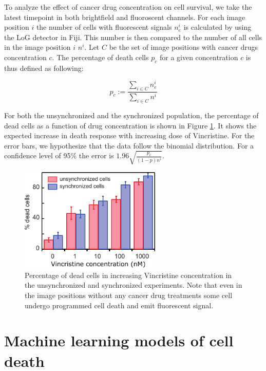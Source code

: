 \documentclass[pdftex,12pt,a4paper]{report}
\begin{document}

To analyze the effect of cancer drug concentration on cell survival, we take the latest timepoint in both brightfield and fluoroscent channels. For each image position $i$ the number of cells with fluorescent signals $n^i_e$ is calculated by using the LoG detector in Fiji. This number is then compared to the number of all cells in the image position $i$ $n^i$. Let $C$ be the set of image positions with cancer drugs concentration $c$. The percentage of death cells $p_c$ for a given concentration $c$ is thus defined as following:

\begin{equation}
p_{c} := \frac{\sum_{i \in C} n^i_{e}}{\sum_{i \in C} n^i}
\end{equation}

For both the unsynchronized and the synchronized population, the percentage of dead cells as a function of drug concentration is shown in Figure \ref{fig:conc_effect}. It shows the expected increase in death response with increasing dose of Vincristine. For the error bars, we hypothesize that the data follow the binomial distribution. For a confidence level of 95\% the error is $1.96 \sqrt{\frac{p_c}{(1 - p)n^i}}$.

\begin{figure}[H]
\centering
\includegraphics[width=0.6\textwidth]{images/conc_effect/conc_effect.pdf}
\caption[Percentage of dead cells in increasing Vincristine concentration in the unsynchronized and synchronized experiments]{Percentage of dead cells in increasing Vincristine concentration in the unsynchronized and synchronized experiments. Note that even in the image positions without any cancer drug treatments some cell undergo programmed cell death and emit fluorescent signal.}
\label{fig:conc_effect}
\end{figure}

\section{Machine learning models of cell death}
\label{section:ml_results}
\end{document}
